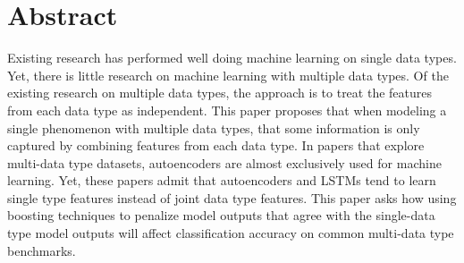 \section{Abstract}

Existing research has performed well doing machine learning on single data types.
Yet, there is little research on machine learning with multiple data types. Of the
existing research on multiple data types, the approach is to treat the features from
each data type as independent. This paper proposes that when modeling a single
phenomenon with multiple data types, that some information is only captured by
combining features from each data type.  In papers that explore multi-data type datasets, autoencoders are almost exclusively used for machine learning.  Yet, these papers admit that autoencoders and LSTMs tend to learn single type features instead of joint data type features.  This paper asks how using boosting techniques to penalize model outputs that agree with the single-data type model outputs will affect classification accuracy on common multi-data type benchmarks.  






